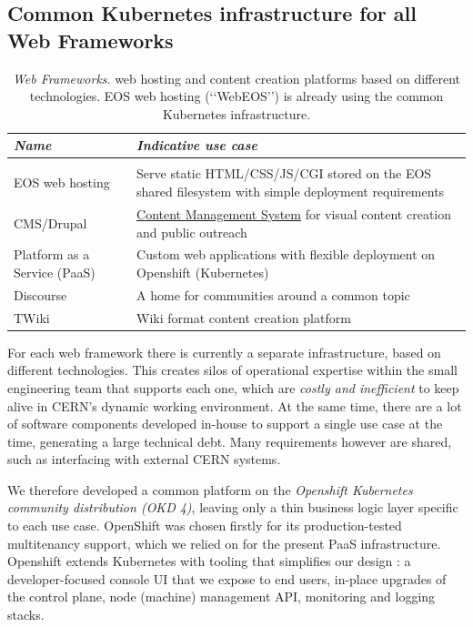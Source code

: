 \subsection{Common Kubernetes infrastructure for all Web Frameworks}
\label{sec-web-frameworks}

\begin{table}[h!]
\begin{tabularx}{\textwidth}{ p{10em}| >{\raggedright\arraybackslash}X}
    \emph{Name} & \emph{Indicative use case} \\
    \hline \\
    EOS web hosting & Serve static HTML/CSS/JS/CGI stored on the EOS shared filesystem with simple deployment requirements \\
    CMS/Drupal & \hyperref[what-is-drupal]{Content Management System} for visual content creation and public outreach \\
    Platform as a Service (PaaS) & Custom web applications with flexible deployment on Openshift (Kubernetes) \\
    Discourse & A home for communities around a common topic \\
    TWiki & Wiki format content creation platform
\end{tabularx}
\caption{\emph{Web Frameworks}. web hosting and content creation platforms based on different technologies.
EOS web hosting (\lq\lq WebEOS\rq\rq) is already using the common Kubernetes infrastructure.}
\vspace{-1.8em}
\label{tab-wf}
\end{table}

For each web framework there is currently a separate infrastructure, based on different technologies.
This creates silos of operational expertise within the small engineering team that supports each one, which are \emph{costly and inefficient} to keep alive in CERN's dynamic working environment.
At the same time, there are a lot of software components developed in-house to support a single use case at the time, generating a large technical debt.
Many requirements however are shared, such as interfacing with external CERN systems.

We therefore developed a common platform on the \emph{Openshift Kubernetes community distribution (OKD 4)},
leaving only a thin business logic layer specific to each use case.
OpenShift was chosen firstly for its production-tested multitenancy support, which we relied on for the present PaaS infrastructure.
Openshift extends Kubernetes with tooling that simplifies our design \cite{jarvinenExtendingKubernetesOperator2019}:
a developer-focused console UI that we expose to end users, in-place upgrades of the control plane, node (machine) management API, monitoring and logging stacks.

